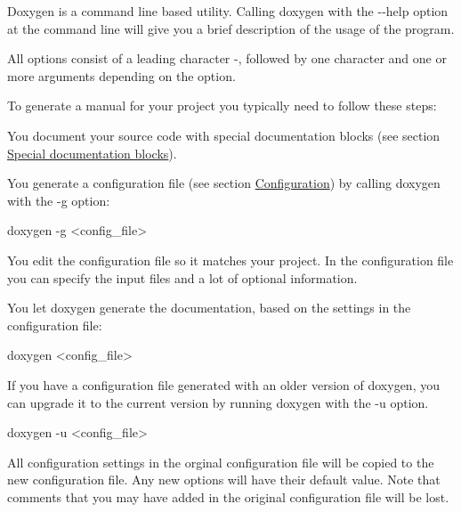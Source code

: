 Doxygen is a command line based utility. Calling {\ttfamily doxygen} with the {\ttfamily -\/-\/help} option at the command line will give you a brief description of the usage of the program.

All options consist of a leading character {\ttfamily -\/}, followed by one character and one or more arguments depending on the option.

To generate a manual for your project you typically need to follow these steps: 
\begin{DoxyEnumerate}
\item You document your source code with special documentation blocks (see section \hyperlink{docblocks_specialblock}{Special documentation blocks}). 
\item You generate a configuration file (see section \hyperlink{config}{Configuration}) by calling doxygen with the {\ttfamily -\/g} option: \begin{DoxyVerb}
doxygen -g <config_file>
\end{DoxyVerb}
 
\item You edit the configuration file so it matches your project. In the configuration file you can specify the input files and a lot of optional information. 
\item You let doxygen generate the documentation, based on the settings in the configuration file: \begin{DoxyVerb}
doxygen <config_file>
\end{DoxyVerb}
 
\end{DoxyEnumerate}

If you have a configuration file generated with an older version of doxygen, you can upgrade it to the current version by running doxygen with the -\/u option. \begin{DoxyVerb}
doxygen -u <config_file>
\end{DoxyVerb}
 All configuration settings in the orginal configuration file will be copied to the new configuration file. Any new options will have their default value. Note that comments that you may have added in the original configuration file will be lost.

